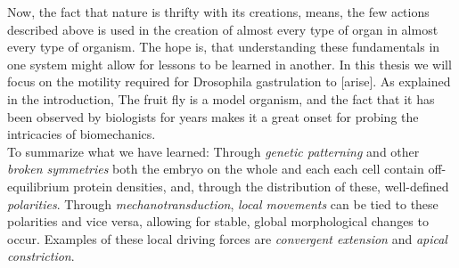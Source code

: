 
Now, the fact that nature is thrifty with its creations, means, the few actions described above is used in the creation of almost every type of organ in almost every type of organism. The hope is, that understanding these fundamentals in one system might allow for lessons to be learned in another. In this thesis we will focus on the motility required for Drosophila gastrulation to [arise]. As explained in the introduction, The fruit fly is a model organism, and the fact that it has been observed by biologists for years makes it a great onset for probing the intricacies of biomechanics.\\



To summarize what we have learned:
Through \textit{genetic patterning} and other \textit{broken symmetries} both the embryo on the whole and each each cell contain off-equilibrium protein densities, and, through the distribution of these, well-defined \textit{polarities}.
Through \textit{mechanotransduction}, \textit{local movements} can be tied to these polarities and vice versa, allowing for stable, global morphological changes to occur. Examples of these local driving forces are \textit{convergent extension} and \textit{apical constriction}.




